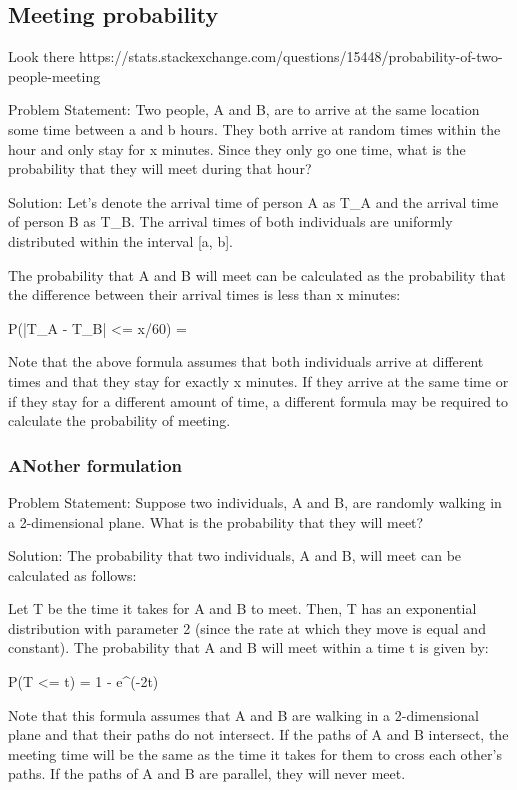 \documentclass[12pt, a4paper, oneside]{article}
\begin{document}
\subsection{ Meeting probability }
Look there https://stats.stackexchange.com/questions/15448/probability-of-two-people-meeting

Problem Statement:
Two people, A and B, are to arrive at the same location some time between a and b hours. They both arrive at random times within the hour and only stay for x minutes. Since they only go one time, what is the probability that they will meet during that hour?

Solution:
Let's denote the arrival time of person A as T_A and the arrival time of person B as T_B. The arrival times of both individuals are uniformly distributed within the interval [a, b].

The probability that A and B will meet can be calculated as the probability that the difference between their arrival times is less than x minutes:

P(|T_A - T_B| <= x/60) = 

Note that the above formula assumes that both individuals arrive at different times and that they stay for exactly x minutes. If they arrive at the same time or if they stay for a different amount of time, a different formula may be required to calculate the probability of meeting.

\subsubsection{ANother formulation}

Problem Statement:
Suppose two individuals, A and B, are randomly walking in a 2-dimensional plane. What is the probability that they will meet?

Solution:
The probability that two individuals, A and B, will meet can be calculated as follows:

Let T be the time it takes for A and B to meet. Then, T has an exponential distribution with parameter 2 (since the rate at which they move is equal and constant). The probability that A and B will meet within a time t is given by:

P(T <= t) = 1 - e^(-2t)

Note that this formula assumes that A and B are walking in a 2-dimensional plane and that their paths do not intersect. If the paths of A and B intersect, the meeting time will be the same as the time it takes for them to cross each other's paths. If the paths of A and B are parallel, they will never meet.
\end{document}
